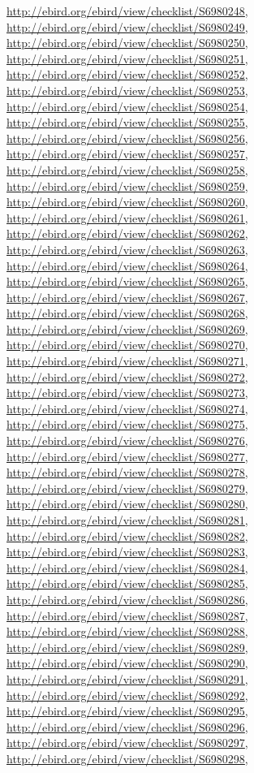 \documentclass[9pt, article]{memoir}
\begin{document}
\begin{multicols}{2}
\url{http://ebird.org/ebird/view/checklist/S6980248}, 
\url{http://ebird.org/ebird/view/checklist/S6980249}, 
\url{http://ebird.org/ebird/view/checklist/S6980250}, 
\url{http://ebird.org/ebird/view/checklist/S6980251}, 
\url{http://ebird.org/ebird/view/checklist/S6980252}, 
\url{http://ebird.org/ebird/view/checklist/S6980253}, 
\url{http://ebird.org/ebird/view/checklist/S6980254}, 
\url{http://ebird.org/ebird/view/checklist/S6980255}, 
\url{http://ebird.org/ebird/view/checklist/S6980256}, 
\url{http://ebird.org/ebird/view/checklist/S6980257}, 
\url{http://ebird.org/ebird/view/checklist/S6980258}, 
\url{http://ebird.org/ebird/view/checklist/S6980259}, 
\url{http://ebird.org/ebird/view/checklist/S6980260}, 
\url{http://ebird.org/ebird/view/checklist/S6980261}, 
\url{http://ebird.org/ebird/view/checklist/S6980262}, 
\url{http://ebird.org/ebird/view/checklist/S6980263}, 
\url{http://ebird.org/ebird/view/checklist/S6980264}, 
\url{http://ebird.org/ebird/view/checklist/S6980265}, 
\url{http://ebird.org/ebird/view/checklist/S6980267}, 
\url{http://ebird.org/ebird/view/checklist/S6980268}, 
\url{http://ebird.org/ebird/view/checklist/S6980269}, 
\url{http://ebird.org/ebird/view/checklist/S6980270}, 
\url{http://ebird.org/ebird/view/checklist/S6980271}, 
\url{http://ebird.org/ebird/view/checklist/S6980272}, 
\url{http://ebird.org/ebird/view/checklist/S6980273}, 
\url{http://ebird.org/ebird/view/checklist/S6980274}, 
\url{http://ebird.org/ebird/view/checklist/S6980275}, 
\url{http://ebird.org/ebird/view/checklist/S6980276}, 
\url{http://ebird.org/ebird/view/checklist/S6980277}, 
\url{http://ebird.org/ebird/view/checklist/S6980278}, 
\url{http://ebird.org/ebird/view/checklist/S6980279}, 
\url{http://ebird.org/ebird/view/checklist/S6980280}, 
\url{http://ebird.org/ebird/view/checklist/S6980281}, 
\url{http://ebird.org/ebird/view/checklist/S6980282}, 
\url{http://ebird.org/ebird/view/checklist/S6980283}, 
\url{http://ebird.org/ebird/view/checklist/S6980284}, 
\url{http://ebird.org/ebird/view/checklist/S6980285}, 
\url{http://ebird.org/ebird/view/checklist/S6980286}, 
\url{http://ebird.org/ebird/view/checklist/S6980287}, 
\url{http://ebird.org/ebird/view/checklist/S6980288}, 
\url{http://ebird.org/ebird/view/checklist/S6980289}, 
\url{http://ebird.org/ebird/view/checklist/S6980290}, 
\url{http://ebird.org/ebird/view/checklist/S6980291}, 
\url{http://ebird.org/ebird/view/checklist/S6980292}, 
\url{http://ebird.org/ebird/view/checklist/S6980295}, 
\url{http://ebird.org/ebird/view/checklist/S6980296}, 
\url{http://ebird.org/ebird/view/checklist/S6980297}, 
\url{http://ebird.org/ebird/view/checklist/S6980298}, 

\end{multicols}
\end{document}
